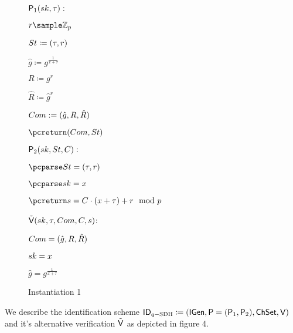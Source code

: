 \begin{figure}[htb!]
{\begin{minipage}[t]{0.5\textwidth}
            
        \end{minipage}
        \begin{minipage}[t]{0.5\textwidth}
            \underline{$\mathsf{P}_1(sk,\tau):$}
            \begin{nicodemus}
            	\item $r \sample \mathbb{Z}_p$
                \item $St \coloneqq (\tau,r )$
                \item $\hat{g} \coloneqq g^{\frac{1}{x+\tau}}$
                \item $R \coloneqq g^r$
                \item $\hat{R} \coloneqq \hat{g}^r$
                \item $Com := (\hat{g},R,\hat{R})$
                \item $\pcreturn (\com,\st)$
            \end{nicodemus}
            
              \underline{$\mathsf{P}_2(sk,St,C):$}
            \begin{nicodemus}
            	\item $\pcparse \st = (\tau,r)$
		\item $\pcparse \sk = x$
                \item $\pcreturn \s =\c\cdot(x+\tau) + r \mod p$
            \end{nicodemus}
                        \underline{$\tilde{\mathsf{V}}(sk,\tau,Com, C,s)$}:
            \begin{nicodemus}
                \item \pcparse $Com = (\hat{g},R,\hat{R})$
                \item \pcparse $sk = x$
                \item \pcif $\hat{g} = g^{\frac{1}{x+\tau}}$ 
                \item \quad \pcthen {}
                \item \pcelse {}
            \end{nicodemus}
        \end{minipage}
    }
    \caption{Instantiation 1}
    \label{fig:prf-security}
\end{figure}

We describe the identification scheme  $\mathsf{ID}_{q-\text{SDH}} \coloneqq(\mathsf{IGen}, \mathsf{P}=(\mathsf{P}_1,\mathsf{P}_2) ,\mathsf{ChSet}, \mathsf{V})$ and it's alternative verification $\tilde{\mathsf{V}}$ as depicted in figure 4.

